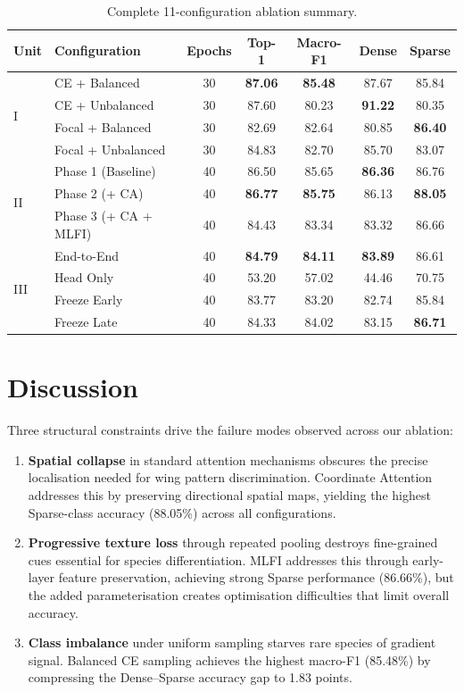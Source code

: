 \documentclass[11pt]{article}
\begin{document}
\begin{table}[H]
\centering
\caption{Complete 11-configuration ablation summary.}
\label{tab:master}
\small
\begin{tabular}{@{}llccccc@{}}
\toprule
\textbf{Unit} & \textbf{Configuration} & \textbf{Epochs} & \textbf{Top-1} & \textbf{Macro-F1} & \textbf{Dense} & \textbf{Sparse} \\
\midrule
\multirow{4}{*}{I}
  & CE + Balanced       & 30 & \textbf{87.06} & \textbf{85.48} & 87.67 & 85.84 \\
  & CE + Unbalanced     & 30 & 87.60 & 80.23 & \textbf{91.22} & 80.35 \\
  & Focal + Balanced    & 30 & 82.69 & 82.64 & 80.85 & \textbf{86.40} \\
  & Focal + Unbalanced  & 30 & 84.83 & 82.70 & 85.70 & 83.07 \\
\midrule
\multirow{3}{*}{II}
  & Phase 1 (Baseline)    & 40 & 86.50 & 85.65 & \textbf{86.36} & 86.76 \\
  & Phase 2 (+ CA)        & 40 & \textbf{86.77} & \textbf{85.75} & 86.13 & \textbf{88.05} \\
  & Phase 3 (+ CA + MLFI) & 40 & 84.43 & 83.34 & 83.32 & 86.66 \\
\midrule
\multirow{4}{*}{III}
  & End-to-End      & 40 & \textbf{84.79} & \textbf{84.11} & \textbf{83.89} & 86.61 \\
  & Head Only       & 40 & 53.20 & 57.02 & 44.46 & 70.75 \\
  & Freeze Early    & 40 & 83.77 & 83.20 & 82.74 & 85.84 \\
  & Freeze Late     & 40 & 84.33 & 84.02 & 83.15 & \textbf{86.71} \\
\bottomrule
\end{tabular}
\end{table}

\section{Discussion}

Three structural constraints drive the failure modes observed across our ablation:
\begin{enumerate}[label=(\arabic*)]
    \item \textbf{Spatial collapse} in standard attention mechanisms obscures the precise localisation needed for wing pattern discrimination. Coordinate Attention addresses this by preserving directional spatial maps, yielding the highest Sparse-class accuracy (88.05\%) across all configurations.
    \item \textbf{Progressive texture loss} through repeated pooling destroys fine-grained cues essential for species differentiation. MLFI addresses this through early-layer feature preservation, achieving strong Sparse performance (86.66\%), but the added parameterisation creates optimisation difficulties that limit overall accuracy.
    \item \textbf{Class imbalance} under uniform sampling starves rare species of gradient signal. Balanced CE sampling achieves the highest macro-F1 (85.48\%) by compressing the Dense--Sparse accuracy gap to 1.83 points.
\end{enumerate}
\end{document}
